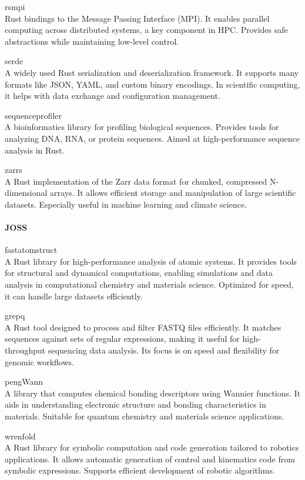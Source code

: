 \documentclass{article}
\begin{document}
rsmpi\\
Rust bindings to the Message Passing Interface (MPI). It enables parallel computing across
distributed systems, a key component in HPC. Provides safe abstractions while maintaining low-level
control.

serde\\
A widely used Rust serialization and deserialization framework. It supports many formats
like JSON, YAML, and custom binary encodings. In scientific computing, it helps with data exchange
and configuration management.

sequenceprofiler\\
A bioinformatics library for profiling biological sequences. Provides tools for
analyzing DNA, RNA, or protein sequences. Aimed at high-performance sequence analysis in Rust.

zarrs\\
A Rust implementation of the Zarr data format for chunked, compressed N-dimensional arrays.
It allows efficient storage and manipulation of large scientific datasets. Especially useful in
machine learning and climate science.

\paragraph{JOSS}

fastatomstruct\\
A Rust library for high-performance analysis of atomic systems. It provides tools
for structural and dynamical computations, enabling simulations and data analysis in computational
chemistry and materials science. Optimized for speed, it can handle large datasets efficiently.

grepq\\
A Rust tool designed to process and filter FASTQ files efficiently. It matches sequences
against sets of regular expressions, making it useful for high-throughput sequencing data analysis.
Its focus is on speed and flexibility for genomic workflows.

pengWann\\
A library that computes chemical bonding descriptors using Wannier functions. It aids in
understanding electronic structure and bonding characteristics in materials. Suitable for quantum
chemistry and materials science applications.

wrenfold\\
A Rust library for symbolic computation and code generation tailored to robotics
applications. It allows automatic generation of control and kinematics code from symbolic
expressions. Supports efficient development of robotic algorithms.
\end{document}
